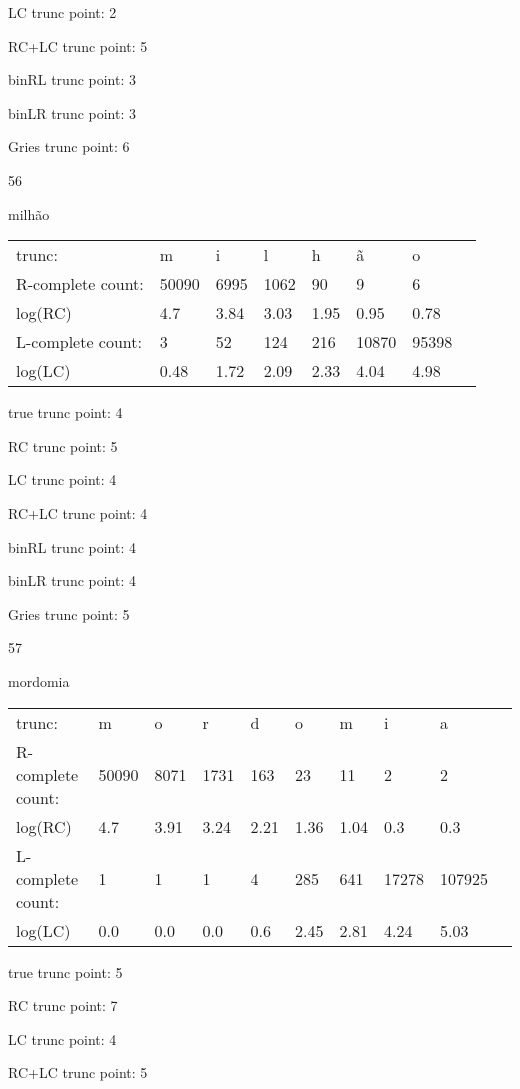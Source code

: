 \documentclass[10pt]{article}
\begin{document}
LC trunc point: 2

RC+LC trunc point: 5

binRL trunc point: 3

binLR trunc point: 3

Gries trunc point: 6

\vspace{1em}

56

milhão

\begin{tabular}{l|lllllll}
trunc: & m & i & l & h & ã & o & \\ 
R-complete count: & 50090 & 6995 & 1062 & 90 & 9 & 6 & \\ 
log(RC) & 4.7 & 3.84 & 3.03 & 1.95 & 0.95 & 0.78 & \\ 
L-complete count: & 3 & 52 & 124 & 216 & 10870 & 95398 & \\ 
log(LC) & 0.48 & 1.72 & 2.09 & 2.33 & 4.04 & 4.98 & \\ 
\end{tabular}

true trunc point: 4

RC trunc point: 5

LC trunc point: 4

RC+LC trunc point: 4

binRL trunc point: 4

binLR trunc point: 4

Gries trunc point: 5

\newpage

57

mordomia

\begin{tabular}{l|lllllllll}
trunc: & m & o & r & d & o & m & i & a & \\ 
R-complete count: & 50090 & 8071 & 1731 & 163 & 23 & 11 & 2 & 2 & \\ 
log(RC) & 4.7 & 3.91 & 3.24 & 2.21 & 1.36 & 1.04 & 0.3 & 0.3 & \\ 
L-complete count: & 1 & 1 & 1 & 4 & 285 & 641 & 17278 & 107925 & \\ 
log(LC) & 0.0 & 0.0 & 0.0 & 0.6 & 2.45 & 2.81 & 4.24 & 5.03 & \\ 
\end{tabular}

true trunc point: 5

RC trunc point: 7

LC trunc point: 4

RC+LC trunc point: 5
\end{document}
